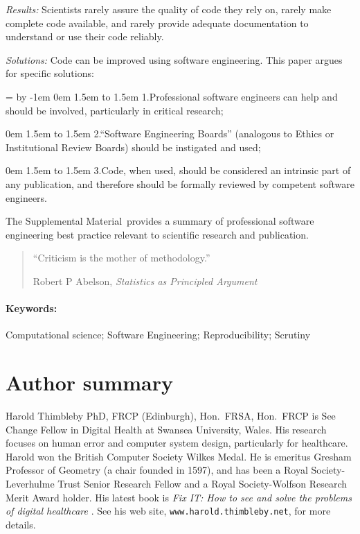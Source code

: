\documentclass[10pt,letterpaper]{article}
\def\supplement{Supplemental Material}
\begin{document}
\noindent\emph{Results:} Scientists rarely assure the quality of code they rely on, rarely make complete code available, and rarely provide adequate documentation to understand or use their code reliably.

\noindent\emph{Solutions:} Code can be improved using software engineering. This paper argues for specific solutions:

\newdimen \mywidth \mywidth=\textwidth
\advance \mywidth by -1em
 0em \textwidth 1.5em \mywidth 
\noindent 
\hbox to 1.5em{ 1.\hfill}Professional software engineers can help and should be involved, particularly in critical research; 

 0em \textwidth 1.5em \mywidth 
\noindent 
\hbox to 1.5em{ 2.\hfill}``Software Engineering Boards'' (analogous to Ethics or Institutional Review Boards) should be instigated and used; 

 0em \textwidth 1.5em \mywidth 
\noindent 
\hbox to 1.5em{ 3.\hfill}Code, when used, should be considered an intrinsic part of any publication, and therefore should be formally reviewed by competent software engineers. 

\noindent
The \supplement\ provides a summary of professional software engineering best practice relevant to scientific research and publication.


\vfill\begin{quote}
\hfill``Criticism is the mother of methodology.''
 
\hfill Robert P Abelson, \emph{Statistics as Principled Argument\/} \cite{abelson}\end{quote}
\vfill
\paragraph*{Keywords:} 
Computational science; Software Engineering; Reproducibility; Scrutiny

\newpage\section*{Author summary}

Harold Thimbleby PhD, FRCP (Edinburgh), Hon.\ FRSA, Hon.\ FRCP is See Change Fellow in Digital Health at Swansea University, Wales. His research focuses on human error and computer system design, particularly for healthcare. 
Harold won the British Computer Society Wilkes Medal. He is emeritus Gresham Professor of Geometry (a chair founded in 1597), and has been a Royal Society-Leverhulme Trust Senior Research Fellow and a Royal Society-Wolfson Research Merit Award holder. His latest book is  \emph{Fix IT: How to see and solve the problems of digital healthcare\/} \cite{fixit}.  See his web site, \texttt{www.harold.thimbleby.net}, for more details.
\linenumbers
\end{document}
